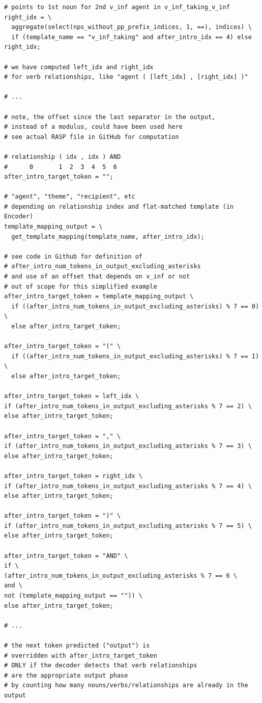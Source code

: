 \documentclass[11pt]{article}
\begin{document}
\begin{tiny}
\begin{verbatim}
# points to 1st noun for 2nd v_inf agent in v_inf_taking_v_inf
right_idx = \
  aggregate(select(nps_without_pp_prefix_indices, 1, ==), indices) \
  if (template_name == "v_inf_taking" and after_intro_idx == 4) else right_idx;

# we have computed left_idx and right_idx
# for verb relationships, like "agent ( [left_idx] , [right_idx] )"

# ...

# note, the offset since the last separator in the output,
# instead of a modulus, could have been used here
# see actual RASP file in GitHub for computation

# relationship ( idx , idx ) AND
#      0       1  2  3  4  5  6
after_intro_target_token = "";

# "agent", "theme", "recipient", etc 
# depending on relationship index and flat-matched template (in Encoder)
template_mapping_output = \
  get_template_mapping(template_name, after_intro_idx);

# see code in Github for definition of 
# after_intro_num_tokens_in_output_excluding_asterisks
# and use of an offset that depends on v_inf or not
# out of scope for this simplified example
after_intro_target_token = template_mapping_output \
  if ((after_intro_num_tokens_in_output_excluding_asterisks) % 7 == 0) \
  else after_intro_target_token;

after_intro_target_token = "(" \
  if ((after_intro_num_tokens_in_output_excluding_asterisks) % 7 == 1) \
  else after_intro_target_token;

after_intro_target_token = left_idx \
if (after_intro_num_tokens_in_output_excluding_asterisks % 7 == 2) \
else after_intro_target_token;

after_intro_target_token = "," \
if (after_intro_num_tokens_in_output_excluding_asterisks % 7 == 3) \
else after_intro_target_token;

after_intro_target_token = right_idx \
if (after_intro_num_tokens_in_output_excluding_asterisks % 7 == 4) \
else after_intro_target_token;

after_intro_target_token = ")" \
if (after_intro_num_tokens_in_output_excluding_asterisks % 7 == 5) \
else after_intro_target_token;

after_intro_target_token = "AND" \
if \
(after_intro_num_tokens_in_output_excluding_asterisks % 7 == 6 \
and \
not (template_mapping_output == "")) \
else after_intro_target_token;

# ...

# the next token predicted ("output") is
# overridden with after_intro_target_token
# ONLY if the decoder detects that verb relationships 
# are the appropriate output phase
# by counting how many nouns/verbs/relationships are already in the output
\end{verbatim}
\end{tiny}
\end{document}
